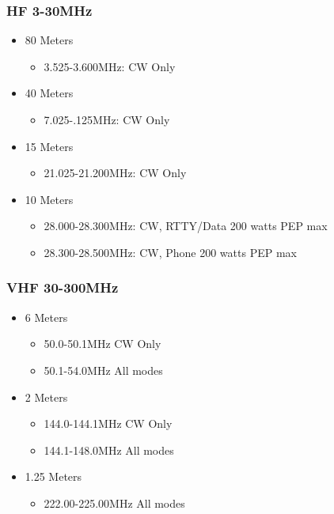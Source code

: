 \documentclass[12pt]{beamer}
\begin{document}
\begin{frame}
\frametitle{HF 3-30MHz}
	\begin{itemize}
	\item 80 Meters
		\begin{itemize}
		\item 3.525-3.600MHz: CW Only
		\end{itemize}
	\item 40 Meters
		\begin{itemize}
		\item 7.025-.125MHz: CW Only
		\end{itemize}
	\item 15 Meters
		\begin{itemize}
		\item 21.025-21.200MHz: CW Only
		\end{itemize}
	\item 10 Meters 
		\begin{itemize}
		\item  28.000-28.300MHz: CW, RTTY/Data 200 watts PEP max 
		\item 28.300-28.500MHz: CW, Phone 200 watts PEP max
		\end{itemize}
	\end{itemize}
\end{frame}

\begin{frame}
\frametitle{VHF 30-300MHz}
	\begin{itemize}
	\item 6 Meters
		\begin{itemize}
		\item 50.0-50.1MHz CW Only
		\item 50.1-54.0MHz All modes
		\end{itemize}
	\item 2 Meters
		\begin{itemize}
		\item  144.0-144.1MHz CW Only
		\item 144.1-148.0MHz All modes
		\end{itemize}
	\item 1.25 Meters
		\begin{itemize}
		\item 222.00-225.00MHz All modes
		\end{itemize}
	\end{itemize}
\end{frame}
\end{document}
